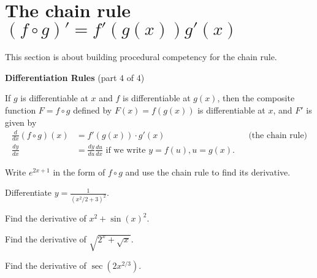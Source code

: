 \documentclass[../main.tex]{subfiles}
\begin{document}
 \section{The chain rule\texorpdfstring{ \((f \circ g)' = f'(g(x))g'(x)\)}{}}

This section is about building procedural competency for the chain rule.

\begin{mdframed}[style=simple]
  \textbf{Differentiation Rules} \hfill {\footnotesize (part \(4\) of \(4\))}

  If \(g\) is differentiable at \(x\) and \(f\) is differentiable at \(g(x)\), then the composite function \(F = f \circ g\) defined by \(F(x) = f(g(x))\) is differentiable at \(x\), and \(F'\) is given by 
  \begin{align*}
    \frac{d}{dx} (f \circ g)(x)
    &= f'(g(x)) \cdot g'(x)
    &&\text{(the chain rule)}\\[1em]
    \frac{dy}{dx} &= \frac{dy}{du} \frac{du}{dx} \text{ if we write } y = f(u), u = g(x).
  \end{align*}
\end{mdframed}

\begin{example}
  Write \(e^{2x + 1}\) in the form of \(f \circ g\) and use the chain rule to find its derivative.

\end{example}


\begin{example}
  Differentiate \(y = \frac{1}{(x^{2}/2 + 3)^{2}}\).

\end{example}
\clearpage{}


\begin{example}
  Find the derivative of \(x^{2} + \sin(x)^{2}\).

\end{example}


\begin{example}
  Find the derivative of \(\sqrt{2^{x} + \sqrt{x}}\).

\end{example}


\begin{example}
  Find the derivative of \(\sec(2x^{2/3})\).

\end{example}
\end{document}
